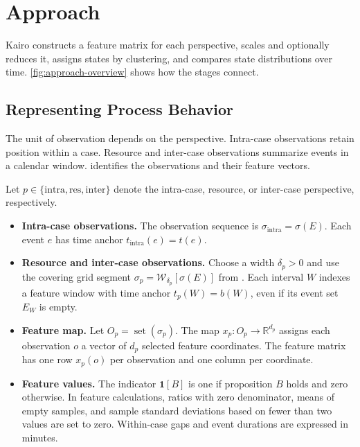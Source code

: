\section{Approach}\label{sec:approach}

Kairo constructs a feature matrix for each perspective, scales and optionally reduces it, assigns states by clustering, and compares state distributions over time. \autoref{fig:approach-overview} shows how the stages connect.

\subsection{Representing Process Behavior}\label{sec:approach-features}

The unit of observation depends on the perspective. Intra-case observations retain position within a case. Resource and inter-case observations summarize events in a calendar window.  identifies the observations and their feature vectors.

\begin{Definition}\label{def:feature-representation}
Let $p\in\{\mathrm{intra},\mathrm{res},\mathrm{inter}\}$ denote the intra-case, resource, or inter-case perspective, respectively.
\begin{itemize}
  \item \textbf{Intra-case observations.} The observation sequence is $\sigma_{\mathrm{intra}}=\sigma(E)$. Each event $e$ has time anchor $t_{\mathrm{intra}}(e)=t(e)$.
  \item \textbf{Resource and inter-case observations.} Choose a width $\delta_p>0$ and use the covering grid segment $\sigma_p=\mathcal W_{\delta_p}[\sigma(E)]$ from . Each interval $W$ indexes a feature window with time anchor $t_p(W)=b(W)$, even if its event set $E_W$ is empty.
  \item \textbf{Feature map.} Let $O_p=\operatorname{set}(\sigma_p)$. The map $x_p\colon O_p\to\mathbb R^{d_p}$ assigns each observation $o$ a vector of $d_p$ selected feature coordinates. The feature matrix has one row $x_p(o)$ per observation and one column per coordinate.
  \item \textbf{Feature values.} The indicator $\mathbf{1}[B]$ is one if proposition $B$ holds and zero otherwise. In feature calculations, ratios with zero denominator, means of empty samples, and sample standard deviations based on fewer than two values are set to zero. Within-case gaps and event durations are expressed in minutes.
\end{itemize}
\end{Definition}

